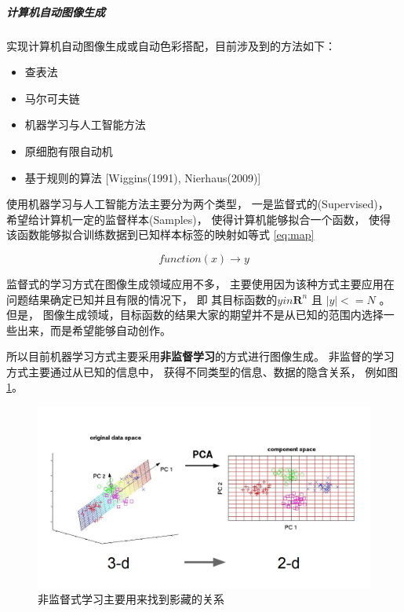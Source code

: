 \subparagraph{计算机自动图像生成} 实现计算机自动图像生成或自动色彩搭配，目前涉及到的方法如下： 

\begin{itemize}

	\item 查表法
	\item 马尔可夫链
	\item 机器学习与人工智能方法
	\item 原细胞有限自动机
	\item 基于规则的算法 [Wiggins(1991), Nierhaus(2009)]
	
\end{itemize}


使用机器学习与人工智能方法主要分为两个类型， 一是监督式的(Supervised)， 希望给计算机一定的监督样本(Samples)， 使得计算机能够拟合一个函数， 使得该函数能够拟合训练数据到已知样本标签的映射如等式 \eqref{eq:map}

\begin{equation}\label{eq:map}
function(x) \rightarrow y
\end{equation}

监督式的学习方式在图像生成领域应用不多， 主要使用因为该种方式主要应用在问题结果确定已知并且有限的情况下， 即 其目标函数的$y in \mathbf{R}^n$ 且 $|y| <= N$ 。 但是， 图像生成领域，目标函数的结果大家的期望并不是从已知的范围内选择一些出来，而是希望能够自动创作。 

所以目前机器学习方式主要采用\textbf{非监督学习}的方式进行图像生成。 非监督的学习方式主要通过从已知的信息中， 获得不同类型的信息、数据的隐含关系， 例如图 \ref{img:unsupervised}。 

\begin{figure}[htbp]
    \centering  %
    \includegraphics[width = .55\linewidth]{data/chapter-2/unsupervised.png} %
    \caption{非监督式学习主要用来找到影藏的关系} %
    \label{img:unsupervised} %
\end{figure}

